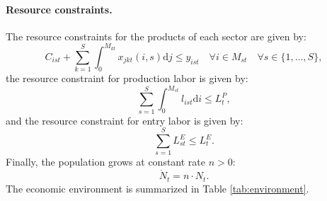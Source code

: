 \documentclass[12pt]{article}
\begin{document}
\paragraph{Resource constraints.} The resource constraints for the products of each sector are given by:
\begin{equation}
    C_{ist} + \sum_{k = 1}^S \int_0^{M_{kt}} x_{jkt}(i, s) \mathrm{d}j \leq y_{ist} \quad \forall i \in M_{st} \quad \forall s \in \{1, \ldots, S\}, \label{eq:product resource constraints}
\end{equation}
the resource constraint for production labor is given by:
\begin{equation}
    \sum_{s = 1}^S \int_0^{M_{st}} l_{ist} \mathrm{d}i \leq L_t^P, \label{eq:production labor resource constraint}
\end{equation}
and the resource constraint for entry labor is given by:
\begin{equation}
    \sum_{s = 1}^S L_{st}^E \leq L_t^E. \label{eq:entry labor resource constraint}
\end{equation}
Finally, the population grows at constant rate $n > 0$:
\begin{equation}
    \dot{N}_t = n \cdot N_t. \label{eq:population}
\end{equation}
The economic environment is summarized in Table \ref{tab:environment}.
\end{document}
